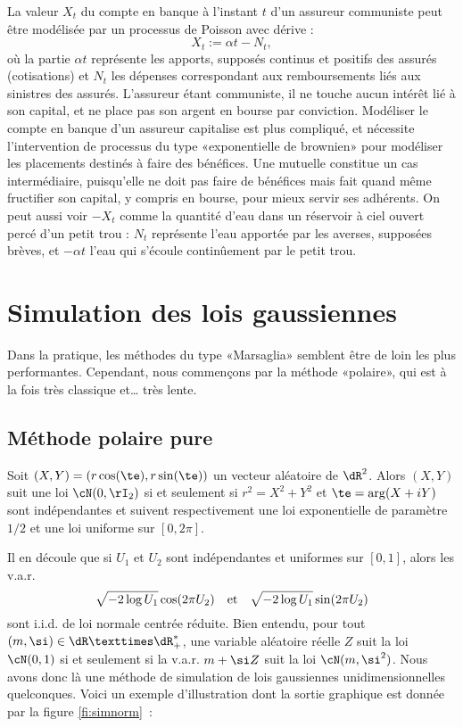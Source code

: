 \begin{remark}
La valeur $X_t$ du compte en banque à l'instant $t$ d'un assureur communiste peut être 
modélisée par un processus de Poisson avec dérive :
$$
X_t:=\alpha t - N_t,
$$
où la partie $\alpha t$ représente les apports, supposés continus et positifs
des assurés (cotisations) et $N_t$ les dépenses correspondant aux
remboursements liés aux sinistres des assurés. L'assureur étant communiste, il
ne touche aucun intérêt lié à son capital, et ne place pas son argent en
bourse par conviction.  Modéliser le compte en banque d'un assureur capitalise
est plus compliqué, et nécessite l'intervention de processus du type
«exponentielle de brownien» pour modéliser les placements destinés à faire des
bénéfices.  Une mutuelle constitue un cas intermédiaire, puisqu'elle ne doit
pas faire de bénéfices mais fait quand même fructifier son capital, y compris
en bourse, pour mieux servir ses adhérents.  On peut aussi voir $-X_t$ comme
la quantité d'eau dans un réservoir à ciel ouvert percé d'un petit trou :
$N_t$ représente l'eau apportée par les averses, supposées brèves, et $-\alpha t$
l'eau qui s'écoule continûement par le petit trou.
\end{remark}

%
\section{Simulation des lois gaussiennes}
\label{ss:simu-gauss}
%

Dans la pratique, les méthodes du type «Marsaglia» semblent être de loin les
plus performantes. Cependant, nous commençons par la méthode «polaire», qui
est à la fois très classique et\ldots{} très lente.

\subsection{Méthode polaire pure}

\begin{thm}
  Soit $(X,Y)=(r\cos(\te),r\sin(\te))$ un vecteur aléatoire de $\dR^2$. Alors
  $(X,Y)$ suit une loi $\cN(0,\rI_2)$ si et seulement si $r^2=X^2+Y^2$ et
  $\te=\arg(X+iY)$ sont indépendantes et suivent respectivement une loi
  exponentielle de paramètre $1/2$ et une loi uniforme sur $[0,2\pi]$.
\end{thm}

Il en découle que si $U_1$ et $U_2$ sont indépendantes et uniformes sur
$[0,1]$, alors les v.a.r.
$$
\sqrt{-2\log U_1} \cos(2\pi U_2) \text{\quad et\quad} \sqrt{-2\log U_1}\sin(2\pi U_2)
$$
sont i.i.d. de loi normale centrée réduite. Bien entendu, pour tout
$(m,\si)\in\dR×\dR_+^*$, une variable aléatoire réelle $Z$ suit la loi
$\cN(0,1)$ si et seulement si la v.a.r. $m+\si Z$ suit la loi $\cN(m,\si^2)$.
Nous avons donc là une méthode de simulation de lois gaussiennes
unidimensionnelles quelconques. Voici un exemple d'illustration dont la sortie
graphique est donnée par la figure \ref{fi:simnorm}~:
%
%
%
